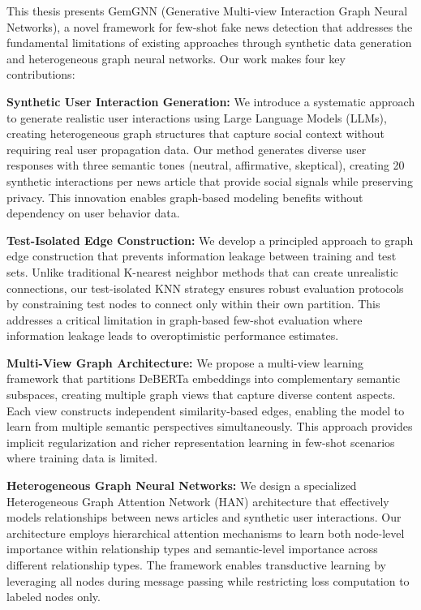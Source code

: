 This thesis presents GemGNN (Generative Multi-view Interaction Graph Neural Networks), a novel framework for few-shot fake news detection that addresses the fundamental limitations of existing approaches through synthetic data generation and heterogeneous graph neural networks. Our work makes four key contributions:

\textbf{Synthetic User Interaction Generation:} We introduce a systematic approach to generate realistic user interactions using Large Language Models (LLMs), creating heterogeneous graph structures that capture social context without requiring real user propagation data. Our method generates diverse user responses with three semantic tones (neutral, affirmative, skeptical), creating 20 synthetic interactions per news article that provide social signals while preserving privacy. This innovation enables graph-based modeling benefits without dependency on user behavior data.

\textbf{Test-Isolated Edge Construction:} We develop a principled approach to graph edge construction that prevents information leakage between training and test sets. Unlike traditional K-nearest neighbor methods that can create unrealistic connections, our test-isolated KNN strategy ensures robust evaluation protocols by constraining test nodes to connect only within their own partition. This addresses a critical limitation in graph-based few-shot evaluation where information leakage leads to overoptimistic performance estimates.

\textbf{Multi-View Graph Architecture:} We propose a multi-view learning framework that partitions DeBERTa embeddings into complementary semantic subspaces, creating multiple graph views that capture diverse content aspects. Each view constructs independent similarity-based edges, enabling the model to learn from multiple semantic perspectives simultaneously. This approach provides implicit regularization and richer representation learning in few-shot scenarios where training data is limited.

\textbf{Heterogeneous Graph Neural Networks:} We design a specialized Heterogeneous Graph Attention Network (HAN) architecture that effectively models relationships between news articles and synthetic user interactions. Our architecture employs hierarchical attention mechanisms to learn both node-level importance within relationship types and semantic-level importance across different relationship types. The framework enables transductive learning by leveraging all nodes during message passing while restricting loss computation to labeled nodes only.

